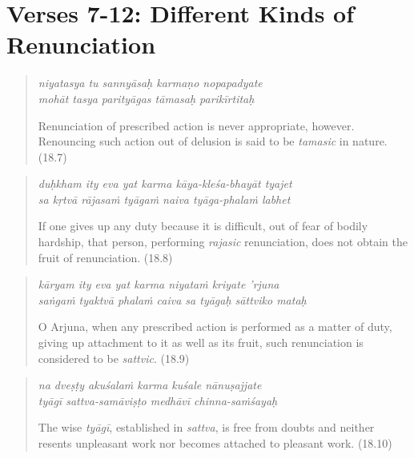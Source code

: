 \documentclass[12pt, twoside, openright]{memoir}
\begin{document}
\section{Verses 7-12: Different Kinds of Renunciation}\label{sec-verses-7-12-different-kinds-of-renunciation}


\par
\begin{verse}
\textit{niyatasya tu sannyāsaḥ karmaṇo nopapadyate} \\
\textit{mohāt tasya parityāgas tāmasaḥ parikīrtitaḥ}

\noindent Renunciation of prescribed action is never appropriate, however. Renouncing such action out of delusion is said to be \textit{tamasic} in nature. (18.7)
\end{verse}
\par



\par
\begin{verse}
\textit{duḥkham ity eva yat karma kāya-kleśa-bhayāt tyajet} \\
\textit{sa kṛtvā rājasaṁ tyāgaṁ naiva tyāga-phalaṁ labhet}

\noindent If one gives up any duty because it is difficult, out of fear of bodily hardship, that person, performing \textit{rajasic} renunciation, does not obtain the fruit of renunciation. (18.8)
\end{verse}
\par



\par
\begin{verse}
\textit{kāryam ity eva yat karma niyataṁ kriyate ’rjuna} \\
\textit{saṅgaṁ tyaktvā phalaṁ caiva sa tyāgaḥ sāttviko mataḥ}

\noindent O Arjuna, when any prescribed action is performed as a matter of duty, giving up attachment to it as well as its fruit, such renunciation is considered to be \textit{sattvic}. (18.9)
\end{verse}
\par



\par
\begin{verse}
\textit{na dveṣṭy akuśalaṁ karma kuśale nānuṣajjate} \\
\textit{tyāgī sattva-samāviṣṭo medhāvī chinna-saṁśayaḥ}

\noindent The wise \textit{tyāgī}, established in \textit{sattva}, is free from doubts and neither resents unpleasant work nor becomes attached to pleasant work. (18.10)
\end{verse}
\par
\end{document}
